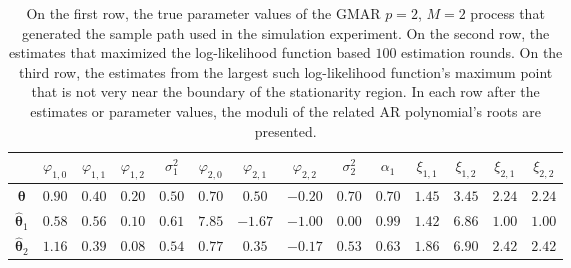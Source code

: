 \documentclass[nojss]{jss} %
\begin{document}
\begin{appendix}
\begin{table}[p]
\centering
\begin{tabular}{c c c c c c c c c c c c c c} %
\hline
    & $\varphi_{1,0}$ & $\varphi_{1,1}$ & $\varphi_{1,2}$ & $\sigma_1^2$ & $\varphi_{2,0}$ & $\varphi_{2,1}$ & $\varphi_{2,2}$ & $\sigma_2^2$ & $\alpha_1$ & $\xi_{1,1}$ & $\xi_{1,2}$ & $\xi_{2,1}$ & $\xi_{2,2}$\\
\hline
$\boldsymbol{\theta}$ & $0.90$ & $0.40$ & $0.20$ & $0.50$ & $0.70$ & $0.50$ & $-0.20$ & $0.70$ & $0.70$ & $1.45$ & $3.45$ & $2.24$ & $2.24$ \\
$\hat{\boldsymbol{\theta}}_1$ & $0.58$ & $0.56$ & $0.10$ & $0.61$ & $7.85$ & $-1.67$ & $-1.00$ & $0.00$ & $0.99$ & $1.42$ & $6.86$ & $1.00$ & $1.00$ \\
$\hat{\boldsymbol{\theta}}_2$ & $1.16$ & $0.39$ & $0.08$ & $0.54$ & $0.77$ & $0.35$ & $-0.17$ & $0.53$ & $0.63$ & $1.86$ & $6.90$ & $2.42$ & $2.42$ \\
\hline
\end{tabular}
\caption{On the first row, the true parameter values of the GMAR $p=2$, $M=2$ process that generated the sample path used in the simulation experiment. On the second row, the estimates that maximized the log-likelihood function based $100$ estimation rounds. On the third row, the estimates from the largest such log-likelihood function's maximum point that is not very near the boundary of the stationarity region. In each row after the estimates or parameter values, the moduli of the related AR polynomial's roots are presented.}
\label{tab:simuexp}
\end{table}


\end{appendix}
\end{document}
